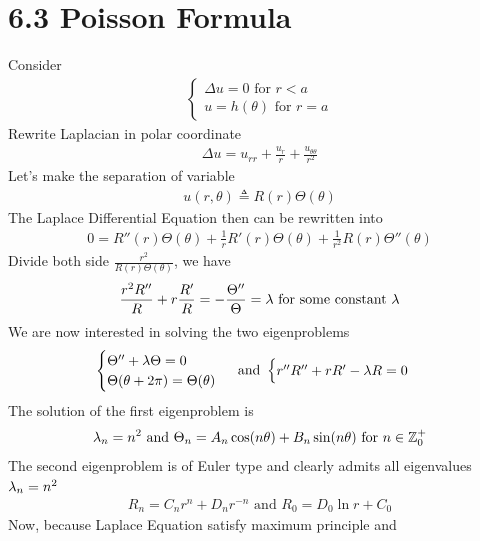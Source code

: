 \documentclass{report}
\begin{document}
\section{6.3 Poisson Formula}
\begin{mdframed}
Consider 
\begin{align*}
\begin{cases}
  \Delta u =0 \text{ for }r<a  \\
  u= h(\theta)\text{ for }r=a
\end{cases}
\end{align*}
Rewrite Laplacian in polar coordinate  
\begin{align*}
\Delta u= u_{rr}+ \frac{u_r}{r}+ \frac{u_{\theta \theta}}{r^2}
\end{align*}
Let's make the separation of variable 
\begin{align*}
u(r,\theta)\triangleq  R(r) \Theta (\theta)
\end{align*}
The Laplace Differential Equation then can be rewritten into  
\begin{align*}
0=R''(r)\Theta  (\theta)+ \frac{1}{r}R'(r)\Theta  (\theta)+ \frac{1}{r^2}R(r)\Theta  ''(\theta)
\end{align*}
Divide both side $\frac{r^2}{R(r)\Theta (\theta)}$, we have 
\begin{align*}
\frac{r^2R''}{R}+ r \frac{R'}{R}= - \frac{\Theta  ''}{\Theta }= \lambda \text{ for some constant  }\lambda 
\end{align*}
We are now interested in solving the two eigenproblems 
\begin{align*}
\begin{cases}
  \Theta '' + \lambda  \Theta =0 \\
  \Theta  (\theta + 2\pi )= \Theta  (\theta) 
\end{cases} \text{ and }\begin{cases}
  r''R''+ rR' - \lambda  R=0
\end{cases}
\end{align*}
The solution of the first eigenproblem is 
\begin{align*}
  \lambda _n=n^2 \text{ and }\Theta _n = A_n \cos (n \theta)+ B_n \sin (n \theta)\text{ for }n \in\mathbb{Z}_0^+
\end{align*}
The second eigenproblem is of Euler type and clearly admits all eigenvalues  $\lambda _n=n^2$ 
\begin{align*}
R_n=C_nr^n + D_n r^{-n}\text{ and }R_0= D_0\ln r + C_0
\end{align*}
Now, because Laplace Equation satisfy maximum principle and 

\end{mdframed}
\end{document}
